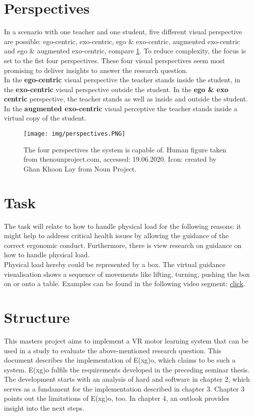 \section{Perspectives}
In a scenario with one teacher and one student, five different visual perspective are possible: ego-centric, exo-centric, ego \& exo-centric, augmented exo-centric and ego \& augmented exo-centric, compare \ref{fig:perspectives}. To reduce complexity, the focus is set to the fist four perspectives. These four visual perspectives seem most promising to deliver insights to answer the research question.\\
In the \textbf{ego-centric} visual perspective the teacher stands inside the student, in the \textbf{exo-centric} visual perspective outside the student. In the \textbf{ego \& exo centric} perspective, the teacher stands as well as inside and outside the student. In the \textbf{augmented exo-centric} visual perceptive the teacher stands inside a virtual copy of the student.\\
\begin{figure}
	\centering
	\texttt{[image: img/perspectives.PNG]}
	\caption{The four perspectives the system is capable of. Human figure taken from thenounproject.com, accessed: 19.06.2020. Icon: created by Ghan Khoon Lay from Noun Project.}
	\label{fig:perspectives}
\end{figure}

\section{Task}
The task will relate to how to handle physical load for the following reasons: it might help to address critical health issues by allowing the guidance of the correct ergonomic conduct. Furthermore, there is view research on guidance on how to handle physical load.\\
Physical load hereby could be represented by a box. The virtual guidance visualisation shows a sequence of movements like lifting, turning, pushing the box on or onto a table. Examples can be found in the following video segment: \href{https://youtu.be/XR5dDxk40WM?t=228}{click}.

\section{Structure}
This masters project aims to implement a VR motor learning system that can be used in a study to evaluate the above-mentioned research question. This document describes the implementation of E(x\textbar g)o, which claims to be such a system. E(x\textbar g)o fulfils the requirements developed in the preceding seminar thesis. The development starts with an analysis of hard and software in chapter 2, which serves as a fundament for the implementation described in chapter 3. Chapter 3 points out the limitations of E(x\textbar g)o, too. In chapter 4, an outlook provides insight into the next steps.


